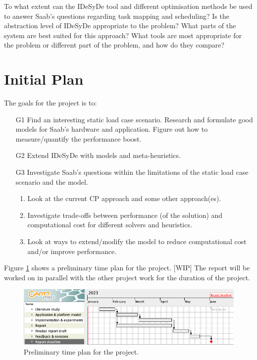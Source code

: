 \documentclass[12pt,notitlepage]{article}
\begin{document}
To what extent can the IDeSyDe tool and different optimisation methods be used to answer Saab's questions regarding task mapping and scheduling? Is the abstraction level of IDeSyDe appropriate to the problem? What parts of the system are best suited for this approach? What tools are most appropriate for the problem or different part of the problem, and how do they compare?

\section{Initial Plan}
The goals for the project is to:
\begin{enumerate}
	\item[G1] Find an interesting static load case scenario. Research and formulate good models for Saab's hardware and application. Figure out how to measure/quantify the performance boost.
	\item[G2] Extend IDeSyDe with models and meta-heuristics.
	\item[G3] Investigate Saab's questions within the limitations of the static load case scenario and the model.
	\begin{enumerate}
		\item Look at the current CP approach and some other approach(es).
		\item Investigate trade-offs between performance (of the solution) and computational cost for different solvers and heuristics.
		\item Look at ways to extend/modify the model to reduce computational cost and/or improve performance.
	\end{enumerate}
\end{enumerate}

\noindent Figure \ref{timeplan} shows a preliminary time plan for the project. [WIP] The report will be worked on in parallel with the other project work for the duration of the project.

\begin{figure}[H]
	\centering
	\includegraphics[scale=0.5]{figures/timeline.png} 
	\caption{Preliminary time plan for the project.}
	\label{timeplan}
\end{figure}
\end{document}
